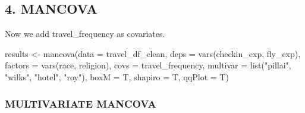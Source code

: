 \documentclass[
]{article}
\newenvironment{Shaded}{\begin{snugshade}}{\end{snugshade}}
\newcommand{\AttributeTok}[1]{\textcolor[rgb]{0.77,0.63,0.00}{#1}}
\newcommand{\FunctionTok}[1]{\textcolor[rgb]{0.00,0.00,0.00}{#1}}
\newcommand{\NormalTok}[1]{#1}
\newcommand{\OtherTok}[1]{\textcolor[rgb]{0.56,0.35,0.01}{#1}}
\newcommand{\SpecialCharTok}[1]{\textcolor[rgb]{0.00,0.00,0.00}{#1}}
\newcommand{\StringTok}[1]{\textcolor[rgb]{0.31,0.60,0.02}{#1}}
\begin{document}
\hypertarget{mancova}{%
\subsection{4. MANCOVA}\label{mancova}}

Now we add travel\_frequency as covariates.\\

\begin{Shaded}
\begin{Highlighting}[]
\NormalTok{results }\OtherTok{\textless{}{-}} \FunctionTok{mancova}\NormalTok{(}\AttributeTok{data =}\NormalTok{ travel\_df\_clean,}
        \AttributeTok{deps =} \FunctionTok{vars}\NormalTok{(checkin\_exp, fly\_exp),}
        \AttributeTok{factors =} \FunctionTok{vars}\NormalTok{(race, religion),}
        \AttributeTok{covs =}\NormalTok{ travel\_frequency,}
        \AttributeTok{multivar =} \FunctionTok{list}\NormalTok{(}\StringTok{"pillai"}\NormalTok{, }\StringTok{"wilks"}\NormalTok{, }\StringTok{"hotel"}\NormalTok{, }\StringTok{"roy"}\NormalTok{), }\AttributeTok{boxM =}\NormalTok{ T,}
        \AttributeTok{shapiro =}\NormalTok{ T, }\AttributeTok{qqPlot =}\NormalTok{ T)}
\end{Highlighting}
\end{Shaded}

\hypertarget{multivariate-mancova}{%
\subsubsection{MULTIVARIATE MANCOVA}\label{multivariate-mancova}}

\begin{Shaded}
\end{Shaded}
\end{document}
